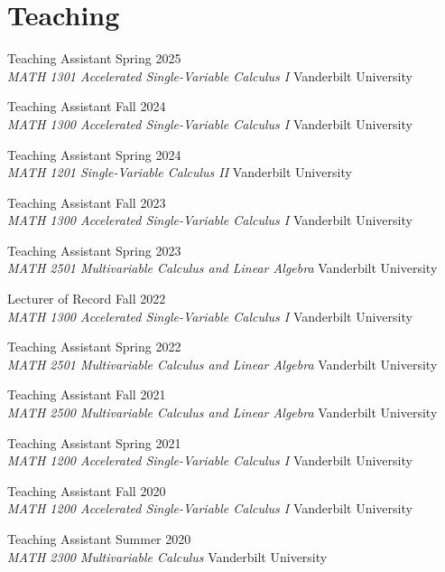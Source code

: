 \documentclass[10pt,a4paper]{article}
\renewenvironment{itemize}{
  \begin{list}{}{
      \setlength{\leftmargin}{1.5em}
      \setlength{\itemsep}{0.25em}
      \setlength{\parskip}{0pt}
      \setlength{\parsep}{0.25em}
    }
}{
  \end{list}
}
\begin{document}
\section*{Teaching}
\begin{itemize}
    \item Teaching Assistant  \hfill Spring 2025 \\
    \textit{MATH 1301 Accelerated Single-Variable Calculus I} \hfill Vanderbilt University
    \item Teaching Assistant  \hfill Fall 2024\\
    \textit{MATH 1300 Accelerated Single-Variable Calculus I} \hfill Vanderbilt University
		\item Teaching Assistant  \hfill Spring 2024 \\
		\textit{MATH 1201 Single-Variable Calculus II} \hfill Vanderbilt University
		\item Teaching Assistant  \hfill Fall 2023\\
		\textit{MATH 1300 Accelerated Single-Variable Calculus I} \hfill Vanderbilt University
		\item Teaching Assistant  \hfill Spring 2023\\
		\textit{MATH 2501 Multivariable Calculus and Linear Algebra} \hfill Vanderbilt University
		\item Lecturer of Record  \hfill Fall 2022\\
		\textit{MATH 1300 Accelerated Single-Variable Calculus I} \hfill Vanderbilt University
		\item Teaching Assistant  \hfill Spring 2022\\
		\textit{MATH 2501 Multivariable Calculus and Linear Algebra} \hfill Vanderbilt University
		\item Teaching Assistant  \hfill Fall 2021\\
		\textit{MATH 2500 Multivariable Calculus and Linear Algebra} \hfill Vanderbilt University
		\item Teaching Assistant  \hfill Spring 2021\\
		\textit{MATH 1200 Accelerated Single-Variable Calculus I} \hfill Vanderbilt University
		\item Teaching Assistant  \hfill Fall 2020\\
		\textit{MATH 1200 Accelerated Single-Variable Calculus I} \hfill Vanderbilt University
		\item Teaching Assistant  \hfill Summer 2020\\
		\textit{MATH 2300 Multivariable Calculus} \hfill Vanderbilt University


\end{itemize}
\end{document}
